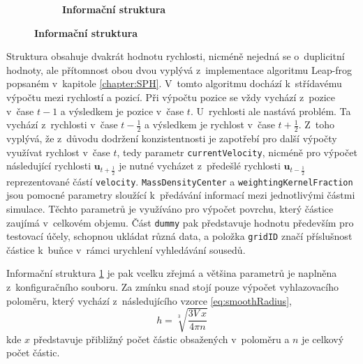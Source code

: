\begin{figure}[h]
\begin{subfigure}[t]{.5\textwidth}
		\caption{\textbf{Informační struktura}}
		\label{fig:SimInfoSPH}
	\end{subfigure}
	\label{fig:structsSPH}
\end{figure}

Struktura obsahuje dvakrát hodnotu rychlosti, nicméně nejedná se o~duplicitní hodnoty, ale přítomnost obou dvou vyplývá z~implementace algoritmu Leap-frog popsaném v~kapitole \ref{chapter:SPH}. V~tomto algoritmu dochází k~střídavému výpočtu mezi rychlostí a pozicí. Při výpočtu pozice se vždy vychází z~pozice v~čase $t-1$ a výsledkem je pozice v~čase $t$. U~rychlosti ale nastává problém. Ta vychází z~rychlosti v~čase $t-\frac{1}{2}$ a výsledkem je rychlost v~čase $t+\frac{1}{2}$. Z~toho vyplývá, že z~důvodu dodržení konzistentnosti je zapotřebí pro další výpočty využívat rychlost v~čase $t$, tedy parametr \texttt{currentVelocity}, nicméně pro výpočet následující rychlosti $\mathbf{u}_{t+\frac{1}{2}}$ je nutné vycházet z~předešlé rychlosti $\mathbf{u}_{t-\frac{1}{2}}$ reprezentované částí \texttt{velocity}. \texttt{MassDensityCenter} a \texttt{weightingKernelFraction} jsou pomocné parametry sloužící k~předávání informací mezi jednotlivými částmi simulace. Těchto parametrů je využíváno pro výpočet povrchu, který částice zaujímá v~celkovém objemu. Část \texttt{dummy} pak představuje hodnotu především pro testovací účely, schopnou ukládat různá data, a položka \texttt{gridID} značí příslušnost částice k~buňce v~rámci urychlení vyhledávání sousedů.

Informační struktura \ref{fig:SimInfoSPH} je pak vcelku zřejmá a většina parametrů je naplněna z~konfiguračního souboru. Za zmínku snad stojí pouze výpočet vyhlazovacího poloměru, který vychází z~následujícího vzorce \ref{eq:smoothRadius},
\begin{equation}
    h=\sqrt[3]{\frac{3 V~x}{4 \pi n}}
    \label{eq:smoothRadius}
\end{equation}
kde $x$ představuje přibližný počet částic obsažených v~poloměru a $n$ je celkový počet částic.

